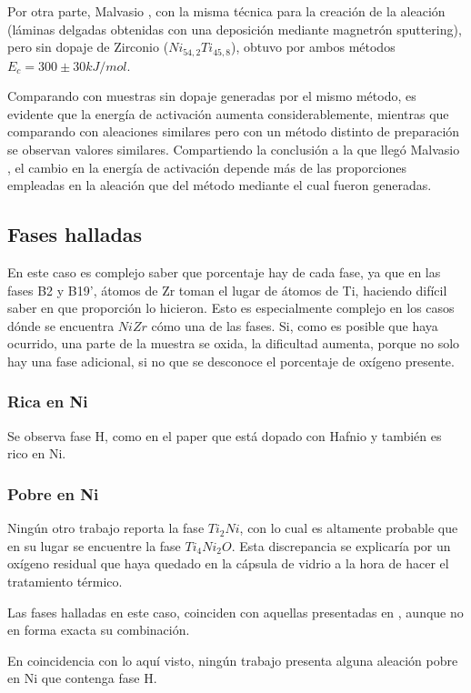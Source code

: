 \documentclass[12pt]{article}
\theoremstyle{definition}
\theoremstyle{remark}
\begin{document}
{Por otra parte, Malvasio , con la misma técnica para la creación de la aleación (láminas delgadas obtenidas con una deposición mediante magnetrón sputtering), pero sin dopaje de Zirconio ($Ni_{54,2}Ti_{45,8}$), obtuvo por ambos métodos $E_c = 300 \pm 30 kJ/mol$.

Comparando con muestras sin dopaje generadas por el mismo método, es evidente que la energía de activación aumenta considerablemente, mientras que comparando con aleaciones similares pero con un método distinto de preparación se observan valores similares. Compartiendo la conclusión a la que llegó Malvasio \cite{Malvasio}, el cambio en la energía de activación depende más de las proporciones empleadas en la aleación que del método mediante el cual fueron generadas.

\subsection{Fases halladas}
En este caso es complejo saber que porcentaje hay de cada fase, ya que en las fases B2 y B19', átomos de Zr toman el lugar de átomos de Ti, haciendo difícil saber en que proporción lo hicieron. Esto es especialmente complejo en los casos dónde se encuentra $NiZr$ cómo una de las fases. Si, como es posible que haya ocurrido, una parte de la muestra se oxida, la dificultad aumenta, porque no solo hay una fase adicional, si no que se desconoce el porcentaje de oxígeno presente.


\subsubsection{Rica en Ni}
Se observa fase H, como en el paper que está dopado con Hafnio y también es rico en Ni.

\subsubsection{Pobre en Ni}

Ningún otro trabajo reporta la fase $Ti_2Ni$, con lo cual es altamente probable que en su lugar se encuentre la fase $Ti_4Ni_2O$. Esta discrepancia se explicaría por un oxígeno residual que haya quedado en la cápsula de vidrio a la hora de hacer el tratamiento térmico.

Las fases halladas en este caso, coinciden con aquellas presentadas en , aunque no en forma exacta su combinación.

En coincidencia con lo aquí visto, ningún trabajo presenta alguna aleación pobre en Ni que contenga fase H.

}
\end{document}
